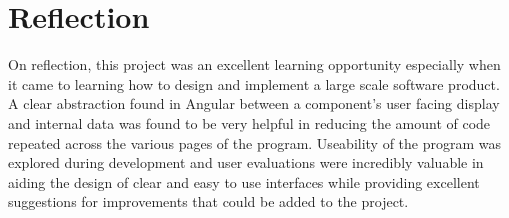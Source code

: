 \documentclass{l4proj}
\begin{document}
\section{Reflection}
On reflection, this project was an excellent learning opportunity especially when it came to learning how to design and implement a large scale software product. A clear abstraction found in Angular between a component's user facing display and internal data was found to be very helpful in reducing the amount of code repeated across the various pages of the program. Useability of the program was explored during development and user evaluations were incredibly valuable in aiding the design of clear and easy to use interfaces while providing excellent suggestions for improvements that could be added to the project.


%
% 
\end{document}
